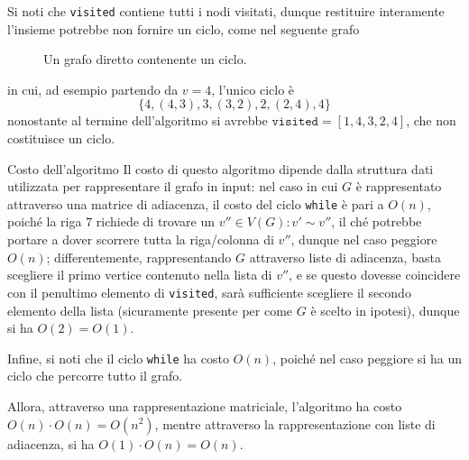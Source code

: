 \documentclass[a4paper, 12pt]{report}
\begin{document}
    \begin{framedobs}{}
        Si noti che \texttt{visited} contiene tutti i nodi visitati, dunque restituire interamente l'insieme potrebbe non fornire un ciclo, come nel seguente grafo
        \begin{figure}[H]
            \centering
            \caption{Un grafo diretto contenente un ciclo.}
        \end{figure}

        in cui, ad esempio partendo da $v= 4$, l'unico ciclo è $$\{4, (4, 3), 3, (3, 2), 2, (2, 4), 4\}$$ nonostante al termine dell'algoritmo si avrebbe $\texttt{visited}=[1, 4, 3, 2, 4]$, che non costituisce un ciclo.

    \end{framedobs}

    \begin{framedobs}{Costo dell'algoritmo}
        Il costo di questo algoritmo dipende dalla struttura dati utilizzata per rappresentare il grafo in input: nel caso in cui $G$ è rappresentato attraverso una matrice di adiacenza, il costo del ciclo \texttt{while} è pari a $O(n)$, poiché la riga $7$ richiede di trovare un $v'' \in V(G) : v' \sim v''$, il ché potrebbe portare a dover scorrere tutta la riga/colonna di $v''$, dunque nel caso peggiore $O(n)$; differentemente, rappresentando $G$ attraverso liste di adiacenza, basta scegliere il primo vertice contenuto nella lista di $v''$, e se questo dovesse coincidere con il penultimo elemento di \texttt{visited}, sarà sufficiente scegliere il secondo elemento della lista (sicuramente presente per come $G$ è scelto in ipotesi), dunque si ha $O(2) = O(1)$.

        Infine, si noti che il ciclo \texttt{while} ha costo $O(n)$, poiché nel caso peggiore si ha un ciclo che percorre tutto il grafo.

        Allora, attraverso una rappresentazione matriciale, l'algoritmo ha costo $O(n) \cdot O(n) = O(n^2)$, mentre attraverso la rappresentazione con liste di adiacenza, si ha $O(1) \cdot O(n) = O(n)$.
    \end{framedobs}
\end{document}
